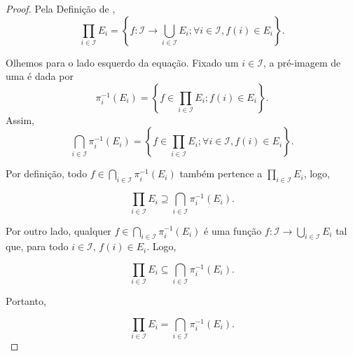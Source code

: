 \begin{proof}
    Pela Definição de ,
    \begin{equation*}
        \prod_{i \in \mathcal{I}} E_i = \left\{f:\mathcal{I}\rightarrow \bigcup_{i \in \mathcal{I}} E_i; \forall i \in \mathcal{I}, f(i)\in E_i \right\}.
    \end{equation*}

    Olhemos para o lado esquerdo da equação. Fixado um $i\in\mathcal{I}$, a pré-imagem de uma  é dada por
    \begin{equation*}
        \pi_{i}^{-1}(E_i) = \left\{f\in \prod_{i\in\mathcal{I}}E_i; f(i)\in E_i\right\}.
    \end{equation*}
    Assim,
    \begin{equation*}
        \bigcap_{i \in \mathcal{I}} \pi_{i}^{-1}(E_i) = \left\{f\in \prod_{i\in\mathcal{I}}E_i; \forall i \in \mathcal{I},f(i)\in E_i\right\}.
    \end{equation*}

    Por definição, todo $f\in \bigcap_{i \in \mathcal{I}} \pi_{i}^{-1}(E_i)$ também pertence a $\prod_{i \in \mathcal{I}} E_i$, logo,

    \begin{equation*}
        \prod_{i \in \mathcal{I}} E_i \supseteq \bigcap_{i \in \mathcal{I}} \pi_{i}^{-1}(E_i). 
    \end{equation*}

    Por outro lado, qualquer $f\in \bigcap_{i \in \mathcal{I}} \pi_{i}^{-1}(E_i)$ é uma função $f:\mathcal{I}\rightarrow \bigcup_{i\in\mathcal{I}} E_i$ tal que, para todo $i\in\mathcal{I}$, $f(i)\in E_i$. Logo,

    \begin{equation*}
        \prod_{i \in \mathcal{I}} E_i \subseteq \bigcap_{i \in \mathcal{I}} \pi_{i}^{-1}(E_i). 
    \end{equation*}

    Portanto, 

    \begin{equation*}
        \prod_{i \in \mathcal{I}} E_i = \bigcap_{i \in \mathcal{I}} \pi_{i}^{-1}(E_i). 
    \end{equation*}
\end{proof}